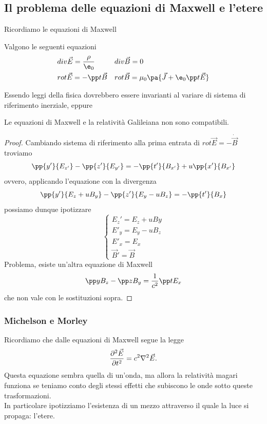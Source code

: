 \subsection{Il problema delle equazioni di Maxwell e l'etere}
Ricordiamo le equazioni di Maxwell
\begin{fact}
Valgono le seguenti equazioni
\begin{align*}
&div\vec E=\frac{\rho}{\e_0}
&&div\vec B=0\\
&rot\vec E=-\pp t{\vec B}
&&rot\vec B=\mu_0\pa{\vec J+\e_0\pp t{\vec E}}
\end{align*}
\end{fact}
\noindent Essendo leggi della fisica dovrebbero essere invarianti al variare di sistema di riferimento inerziale, eppure

\begin{example}
Le equazioni di Maxwell e la relativit\`a Galileiana non sono compatibili.
\end{example}
\begin{proof}
Cambiando sistema di riferimento alla prima entrata di $rot\vec E=-\dot{\vec B}$ troviamo
\[\pp {y'}{E_{z'}}-\pp {z'}{E_{y'}}=-\pp {t'}{B_{x'}}+u\pp {x'}{B_{x'}}\]
ovvero, applicando l'equazione con la divergenza
\[\pp {y'}{E_{z}+uB_y}-\pp {z'}{E_{y}-uB_z}=-\pp {t'}{B_{x}}\]
possiamo dunque ipotizzare
\[\begin{cases}
E_z'=E_z+uBy\\
E'_y=E_y-uB_z\\
E'_x=E_x\\
\vec B'=\vec B
\end{cases}\]
Problema, esiste un'altra equazione di Maxwell
\[\pp y{B_z}-\pp z{B_y}=\frac1{c^2}\pp t{E_x}\]
che non vale con le sostituzioni sopra.
\end{proof}

\subsubsection{Michelson e Morley}
Ricordiamo che dalle equazioni di Maxwell segue la legge
\[\pps[2]t{\vec E}=c^2\nabla^2\vec E.\]
Questa equazione sembra quella di un'onda, ma allora la relativit\`a magari funziona se teniamo conto degli stessi effetti che subiscono le onde sotto queste trasformazioni.\\
In particolare ipotizziamo l'esistenza di un mezzo attraverso il quale la luce si propaga: l'etere.

